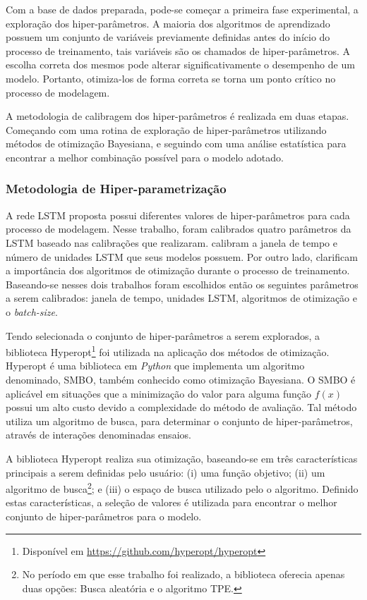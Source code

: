 Com a base de dados preparada, pode-se começar a primeira fase experimental, a exploração dos hiper-parâmetros. A maioria dos algoritmos de aprendizado possuem um conjunto de variáveis previamente definidas antes do início do processo de treinamento, tais variáveis são os chamados de hiper-parâmetros. A escolha correta dos mesmos pode alterar significativamente o desempenho de um modelo. Portanto, otimiza-los de forma correta se torna um ponto crítico no processo de modelagem.

A metodologia de calibragem dos hiper-parâmetros é realizada em duas etapas. Começando com uma rotina de exploração de hiper-parâmetros utilizando métodos de otimização Bayesiana, e seguindo com uma análise estatística para encontrar a melhor combinação possível para o modelo adotado.

\subsubsection{Metodologia de Hiper-parametrização}

A rede \acrshort{LSTM} proposta possui diferentes valores de hiper-parâmetros para cada processo de modelagem. Nesse trabalho, foram calibrados quatro parâmetros da \acrshort{LSTM} baseado nas calibrações que \textcite{random_forest_macroeconomic, ga_optimized_lstm} realizaram. \textcite{ga_optimized_lstm} calibram a janela de tempo e número de unidades \acrshort{LSTM} que seus modelos possuem. Por outro lado, \textcite{random_forest_macroeconomic} clarificam a importância dos algoritmos de otimização durante o processo de treinamento. Baseando-se nesses dois trabalhos foram escolhidos então os seguintes parâmetros a serem calibrados: janela de tempo, unidades \acrshort{LSTM}, algoritmos de otimização e o \textit{batch-size}.

Tendo selecionada o conjunto de hiper-parâmetros a serem explorados, a biblioteca Hyperopt\footnote{Disponível em \url{https://github.com/hyperopt/hyperopt}} foi utilizada na aplicação dos métodos de otimização. Hyperopt é uma biblioteca em \textit{Python} que implementa um algoritmo denominado, \acrfull{SMBO}, também conhecido como otimização Bayesiana. O \acrshort{SMBO} é aplicável em situações que a minimização do valor para alguma função $f(x)$ possui um alto custo devido a complexidade do método de avaliação. Tal método utiliza um algoritmo de busca, para determinar o conjunto de hiper-parâmetros, através de interações denominadas ensaios. 

A biblioteca Hyperopt realiza sua otimização, baseando-se em três características principais a serem definidas pelo usuário: (i) uma função objetivo; (ii) um algoritmo de busca\footnote{No período em que esse trabalho foi realizado, a biblioteca oferecia apenas duas opções: Busca aleatória e o algoritmo \acrfull{TPE}.}; e (iii) o espaço de busca utilizado pelo o algoritmo. Definido estas características, a seleção de valores é utilizada para encontrar o melhor conjunto de hiper-parâmetros para o modelo.

